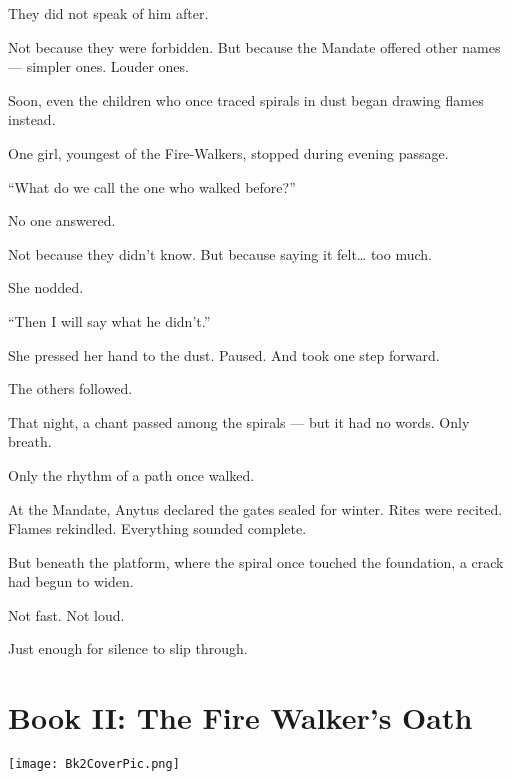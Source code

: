 \documentclass[12pt]{article}
\begin{document}
They did not speak of him after.

Not because they were forbidden.  
But because the Mandate offered other names —  
simpler ones.  
Louder ones.

Soon, even the children who once traced spirals in dust  
began drawing flames instead.

One girl, youngest of the Fire-Walkers,  
stopped during evening passage.

 “What do we call the one who walked before?”

No one answered.

Not because they didn’t know.  
But because saying it felt… too much.

She nodded.

 “Then I will say what he didn’t.”

She pressed her hand to the dust.  
Paused.  
And took one step forward.

The others followed.

That night, a chant passed among the spirals —  
but it had no words.  
Only breath.

Only the rhythm of a path once walked.

At the Mandate, Anytus declared the gates sealed for winter.  
Rites were recited.  
Flames rekindled.  
Everything sounded complete.

But beneath the platform,  
where the spiral once touched the foundation,  
a crack had begun to widen.

Not fast.  
Not loud.

Just enough  
for silence to slip through.

\newpage

\section*{Book II: The Fire Walker's Oath}

\vspace{.5in}

\begin{center}
    \texttt{[image: Bk2CoverPic.png]}
\end{center}

\vspace{.5in}
\end{document}
